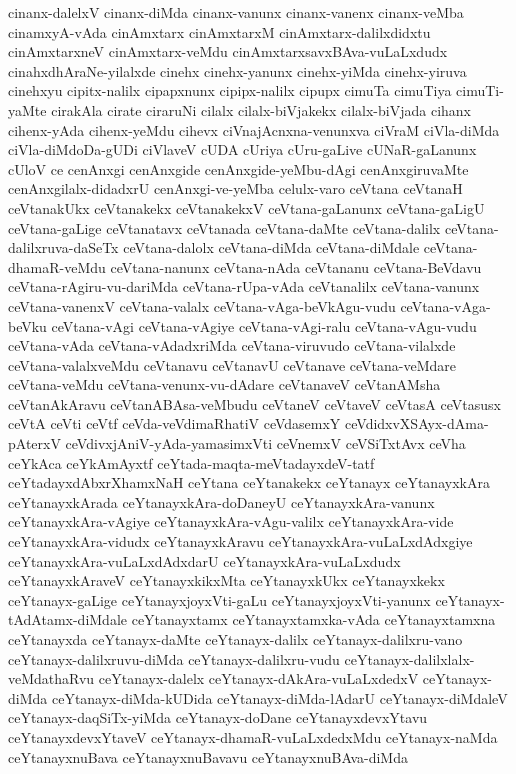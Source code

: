 {cinanx-dalelxV
cinanx-diMda
cinanx-vanunx
cinanx-vanenx
cinanx-veMba
cinamxyA-vAda
cinAmxtarx
cinAmxtarxM
cinAmxtarx-dalilxdidxtu
cinAmxtarxneV
cinAmxtarx-veMdu
cinAmxtarxsavxBAva-vuLaLxdudx
cinahxdhAraNe-yilalxde
cinehx
cinehx-yanunx
cinehx-yiMda
cinehx-yiruva
cinehxyu
cipitx-nalilx
cipapxnunx
cipipx-nalilx
cipupx
cimuTa
cimuTiya
cimuTi-yaMte
cirakAla
cirate
ciraruNi
cilalx
cilalx-biVjakekx
cilalx-biVjada
cihanx
cihenx-yAda
cihenx-yeMdu
cihevx
ciVnajAcnxna-venunxva
ciVraM
ciVla-diMda
ciVla-diMdoDa-gUDi
ciVlaveV
cUDA
cUriya
cUru-gaLive
cUNaR-gaLanunx
cUloV
ce
cenAnxgi
cenAnxgide
cenAnxgide-yeMbu-dAgi
cenAnxgiruvaMte
cenAnxgilalx-didadxrU
cenAnxgi-ve-yeMba
celulx-varo
ceVtana
ceVtanaH
ceVtanakUkx
ceVtanakekx
ceVtanakekxV
ceVtana-gaLanunx
ceVtana-gaLigU
ceVtana-gaLige
ceVtanatavx
ceVtanada
ceVtana-daMte
ceVtana-dalilx
ceVtana-dalilxruva-daSeTx
ceVtana-dalolx
ceVtana-diMda
ceVtana-diMdale
ceVtana-dhamaR-veMdu
ceVtana-nanunx
ceVtana-nAda
ceVtananu
ceVtana-BeVdavu
ceVtana-rAgiru-vu-dariMda
ceVtana-rUpa-vAda
ceVtanalilx
ceVtana-vanunx
ceVtana-vanenxV
ceVtana-valalx
ceVtana-vAga-beVkAgu-vudu
ceVtana-vAga-beVku
ceVtana-vAgi
ceVtana-vAgiye
ceVtana-vAgi-ralu
ceVtana-vAgu-vudu
ceVtana-vAda
ceVtana-vAdadxriMda
ceVtana-viruvudo
ceVtana-vilalxde
ceVtana-valalxveMdu
ceVtanavu
ceVtanavU
ceVtanave
ceVtana-veMdare
ceVtana-veMdu
ceVtana-venunx-vu-dAdare
ceVtanaveV
ceVtanAMsha
ceVtanAkAravu
ceVtanABAsa-veMbudu
ceVtaneV
ceVtaveV
ceVtasA
ceVtasusx
ceVtA
ceVti
ceVtf
ceVda-veVdimaRhatiV
ceVdasemxY
ceVdidxvXSAyx-dAma-pAterxV
ceVdivxjAniV-yAda-yamasimxVti
ceVnemxV
ceVSiTxtAvx
ceVha
ceYkAca
ceYkAmAyxtf
ceYtada-maqta-meVtadayxdeV-tatf
ceYtadayxdAbxrXhamxNaH
ceYtana
ceYtanakekx
ceYtanayx
ceYtanayxkAra
ceYtanayxkArada
ceYtanayxkAra-doDaneyU
ceYtanayxkAra-vanunx
ceYtanayxkAra-vAgiye
ceYtanayxkAra-vAgu-valilx
ceYtanayxkAra-vide
ceYtanayxkAra-vidudx
ceYtanayxkAravu
ceYtanayxkAra-vuLaLxdAdxgiye
ceYtanayxkAra-vuLaLxdAdxdarU
ceYtanayxkAra-vuLaLxdudx
ceYtanayxkAraveV
ceYtanayxkikxMta
ceYtanayxkUkx
ceYtanayxkekx
ceYtanayx-gaLige
ceYtanayxjoyxVti-gaLu
ceYtanayxjoyxVti-yanunx
ceYtanayx-tAdAtamx-diMdale
ceYtanayxtamx
ceYtanayxtamxka-vAda
ceYtanayxtamxna
ceYtanayxda
ceYtanayx-daMte
ceYtanayx-dalilx
ceYtanayx-dalilxru-vano
ceYtanayx-dalilxruvu-diMda
ceYtanayx-dalilxru-vudu
ceYtanayx-dalilxlalx-veMdathaRvu
ceYtanayx-dalelx
ceYtanayx-dAkAra-vuLaLxdedxV
ceYtanayx-diMda
ceYtanayx-diMda-kUDida
ceYtanayx-diMda-lAdarU
ceYtanayx-diMdaleV
ceYtanayx-daqSiTx-yiMda
ceYtanayx-doDane
ceYtanayxdevxYtavu
ceYtanayxdevxYtaveV
ceYtanayx-dhamaR-vuLaLxdedxMdu
ceYtanayx-naMda
ceYtanayxnuBava
ceYtanayxnuBavavu
ceYtanayxnuBAva-diMda
}
